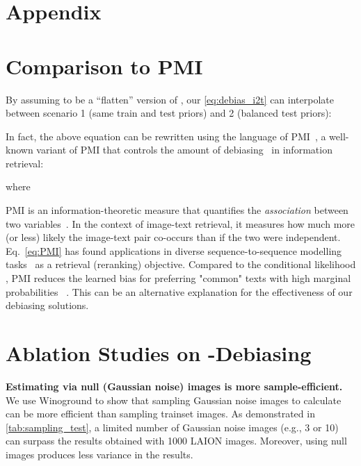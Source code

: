 \documentclass{article} \usepackage{iclr2024_conference,times}
\begin{document}



\clearpage
\appendix
\vspace{-0.1in}
\section*{\Large Appendix}







        





















\section{Comparison to PMI}
\label{app:pmi}
By assuming  to be a ``flatten'' version of , our \autoref{eq:debias_i2t} can interpolate between scenario 1 (same train and test priors) and 2 (balanced test priors):

In fact, the above equation can be rewritten using the language of PMI~\citep{role2011handling, daille1994approche}, a well-known variant of PMI that controls the amount of debiasing~\citep{pmimt1, pmimt2, pmiretrieval} in information retrieval:

where 

PMI is an information-theoretic measure that quantifies the {\em association} between two variables~\citep{yao2010co, henning2017estimating, shrivastava2021clip}. In the context of image-text retrieval, it measures how much more (or less) likely the image-text pair co-occurs than if the two were independent. Eq.~\ref{eq:PMI} has found applications in diverse sequence-to-sequence modelling tasks~\citep{pmiretrieval, pmimt2, pmimt1} as a retrieval (reranking) objective. Compared to the conditional likelihood , PMI reduces the learned bias for preferring "common" texts with high marginal probabilities ~\citep{pmimt1, pmimt2, pmiretrieval}. This can be an alternative explanation for the effectiveness of our debiasing solutions. 

\section{Ablation Studies on -Debiasing}
\label{app:alpha_ablation}
{\bf Estimating  via null (Gaussian noise) images is more sample-efficient.} We use Winoground to show that sampling Gaussian noise images to calculate  can be more efficient than sampling trainset images. As demonstrated in \autoref{tab:sampling_test}, a limited number of Gaussian noise images (e.g., 3 or 10) can surpass the results obtained with 1000 LAION images. Moreover, using null images produces less variance in the results.
\end{document}
